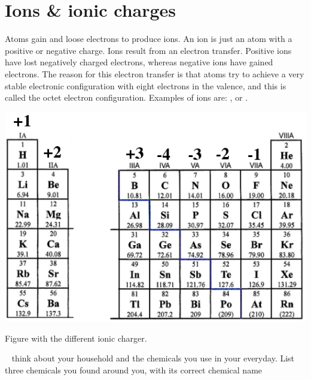 \documentclass[main.tex]{subfiles}
\begin{document}
\section{Ions \& ionic charges}
Atoms gain and loose electrons to produce ions. An ion is just an atom with a positive or negative charge. Ions result from an electron transfer. Positive ions have lost negatively charged electrons, whereas negative ions have gained electrons. The reason for this electron transfer is that atoms try to achieve a very stable electronic configuration with eight electrons in the valence, and this is called the octet electron configuration. Examples of ions are: ,  or .\sloppy 
\begin{marginfigure}%
      \includegraphics{chapter5/figure2}
      \label{image51}
      \caption{Figure with the different ionic charger.}              
   \end{marginfigure}%
   
\begin{marginfigure}
\begin{tcolorbox}[enhanced,colback=red!5!white,colframe=black!50!red,boxrule=1pt,
  arc=0pt,outer arc=0pt,drop heavy lifted shadow]
\faGears\ 
 think about your household and the chemicals you use in your everyday. List three chemicals you found around you, with its correct chemical name \end{tcolorbox}
\end{marginfigure} 
   
\end{document}
